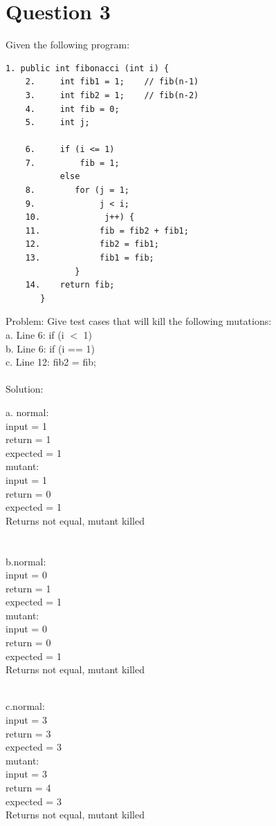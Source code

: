 \documentclass{article}
\begin{document}
\newpage

\section*{Question 3}
Given the following program:
\begin{Verbatim}[tabsize=4]
	1. public int fibonacci (int i) { 
	2.     int fib1 = 1;    // fib(n-1)
	3.     int fib2 = 1;    // fib(n-2)
	4.     int fib = 0;
	5.     int j;

	6.     if (i <= 1) 
	7.         fib = 1;
	       else 
	8.        for (j = 1;
	9.             j < i;
	10.             j++) {
	11.            fib = fib2 + fib1;
	12.            fib2 = fib1;
	13.            fib1 = fib;
	          }
	14.    return fib;		
	   }
\end{Verbatim}
\bigskip
\noindent
Problem: Give test cases that will kill the following mutations: \\
a. Line 6: if (i $<$ 1)	\\
b. Line 6: if (i == 1)	\\
c. Line 12: fib2 = fib;	\\\\
Solution:\\
\begin{multicols}{2}
\noindent
a. normal: \\
	input = 1 \\
	return = 1 \\
	expected = 1 \\
	mutant: \\
	input = 1 \\
	return = 0 \\
	expected = 1\\
Returns not equal, mutant killed \\\\\\
b.normal: \\
input = 0 \\
return = 1 \\
expected = 1 \\
mutant: \\
input = 0 \\
return = 0 \\
expected = 1 \\
Returns not equal, mutant killed \\\\
\end{multicols}
\noindent
c.normal: \\
input = 3 \\
return = 3 \\
expected = 3 \\
mutant: \\
input = 3 \\
return = 4 \\
expected = 3 \\
Returns not equal, mutant killed \\\\

	
\end{document}
